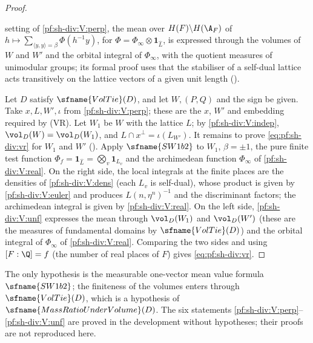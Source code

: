 \begin{proof}
\begin{enumerate}[label=(V\arabic*)]
setting of \ref{pf:sh-div:V:perp}, the mean over $H(F)\backslash H(\A_F)$ of $h\mapsto\sum_{\langle y,y\rangle=\beta}\Phi(h^{-1}y)$, for
$\Phi=\Phi_\infty\otimes\mathbf 1_{\widehat L}$, is expressed through the volumes of $W$ and $W'$ and the orbital integral of $\Phi_\infty$,
with the quotient measures of unimodular groups; its formal proof uses that the stabiliser of a self-dual lattice acts transitively
on the lattice vectors of a given unit length ().
\end{enumerate}
Let $D$ satisfy $\sfname{VolTie}(D)$, and let $W,(P,Q)$ and the sign be given. Take $x,L,W',\iota$ from \ref{pf:sh-div:V:perp}; these
are the $x$, $W'$ and embedding required by (VR). Let $W_1$ be $W$ with the lattice $L$; by \ref{pf:sh-div:V:indep},
$\vol_D(W)=\vol_D(W_1)$, and $L\cap x^\perp=\iota(L_{W'})$. It remains to prove \eqref{eq:pf:sh-div:vr} for $W_1$ and $W'$
(). Apply $\sfname{SW1b2}$ to $W_1$, $\beta=\pm1$, the pure finite test function
$\Phi_f=\mathbf 1_{\widehat L}=\bigotimes_v\mathbf 1_{L_v}$ and the archimedean function $\Phi_\infty$ of \ref{pf:sh-div:V:real}. On the right
side, the local integrals at the finite places are the densities of \ref{pf:sh-div:V:dens} (each $L_v$ is self-dual), whose product is
given by \ref{pf:sh-div:V:euler} and produces $L(n,\eta^n)^{-1}$ and the discriminant factors; the archimedean integral is given by
\ref{pf:sh-div:V:real}. On the left side, \ref{pf:sh-div:V:unf} expresses the mean through $\vol_D(W_1)$ and $\vol_D(W')$ (these are the
measures of fundamental domains by $\sfname{VolTie}(D)$) and the orbital integral of $\Phi_\infty$ of \ref{pf:sh-div:V:real}. Comparing
the two sides and using $[F:\Q]=f$ (the number of real places of $F$) gives \eqref{eq:pf:sh-div:vr}.
\end{proof}

\begin{remark}\label{pf:sh-div:rem:volratio}
The only hypothesis is the measurable one-vector mean value formula $\sfname{SW1b2}$; the finiteness of the volumes enters through
$\sfname{VolTie}(D)$, which is a hypothesis of $\sfname{MassRatioUnderVolume}(D)$. The six statements
\ref{pf:sh-div:V:perp}--\ref{pf:sh-div:V:unf} are proved in the development without hypotheses; their proofs are not reproduced here.
\end{remark}

